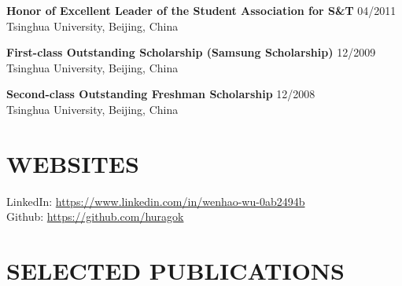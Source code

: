 \documentclass[margin]{res} %
\begin{document}
\begin{resume}
        {\bf Honor of Excellent Leader of the Student Association for S\&T}
        \hfill 04/2011 \\
        Tsinghua University, Beijing, China
        
        {\bf First-class Outstanding Scholarship (Samsung Scholarship)}
        \hfill 12/2009 \\
        Tsinghua University, Beijing, China
        
        {\bf Second-class Outstanding Freshman Scholarship}
        \hfill 12/2008 \\
        Tsinghua University, Beijing, China
        
    
        \section{WEBSITES} 
        LinkedIn: \url{https://www.linkedin.com/in/wenhao-wu-0ab2494b}\\
        Github: \url{https://github.com/huragok}
        
        \section{SELECTED PUBLICATIONS}
        
        \renewcommand{\section}[2]{}
\end{resume}
\end{document}
